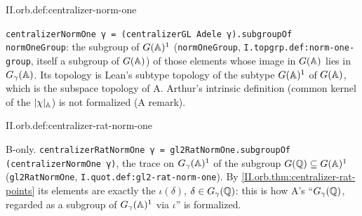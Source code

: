 \begin{definition}
\end{definition}
\begin{tfformal}{II.orb.def:centralizer-norm-one}
\begin{tffidelity}
\texttt{centralizerNormOne γ = (centralizerGL Adele γ).subgroupOf normOneGroup}: the subgroup of $G(\mathbb{A})^1$ (\texttt{normOneGroup}, \texttt{I.topgrp.def:norm-one-group}, itself a subgroup of $G(\mathbb{A})$) of those elements whose image in $G(\mathbb{A})$ lies in $G_\gamma(\mathbb{A})$. Its topology is Lean's subtype topology of the subtype $G(\mathbb{A})^1$ of $G(\mathbb{A})$, which is the subspace topology of A. Arthur's intrinsic definition (common kernel of the $\lvert\chi\rvert_{\mathbb{A}}$) is not formalized (A remark).
\end{tffidelity}
\end{tfformal}

\begin{definition}
\bonly
{}
\end{definition}
\begin{tfformal}{II.orb.def:centralizer-rat-norm-one}
\begin{tffidelity}
B-only. \texttt{centralizerRatNormOne γ = gl2RatNormOne.subgroupOf (centralizerNormOne γ)}, the trace on $G_\gamma(\mathbb{A})^1$ of the subgroup $G(\mathbb{Q})\subseteq G(\mathbb{A})^1$ (\texttt{gl2RatNormOne}, \texttt{I.quot.def:gl2-rat-norm-one}). By \cref{II.orb.thm:centralizer-rat-points} its elements are exactly the $\iota(\delta)$, $\delta\in G_\gamma(\mathbb{Q})$: this is how A's ``$G_\gamma(\mathbb{Q})$, regarded as a subgroup of $G_\gamma(\mathbb{A})^1$ via $\iota$'' is formalized.
\end{tffidelity}
\end{tfformal}

